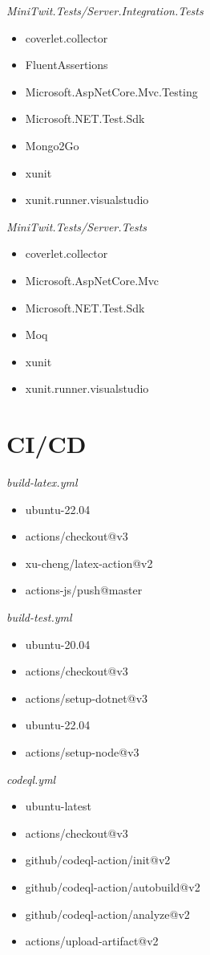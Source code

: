 \textit{MiniTwit.Tests/Server.Integration.Tests}
\begin{itemize}
   \item coverlet.collector 
   \item FluentAssertions  
   \item Microsoft.AspNetCore.Mvc.Testing    
   \item Microsoft.NET.Test.Sdk  
   \item Mongo2Go   
   \item xunit     
   \item xunit.runner.visualstudio  
\end{itemize}

\textit{MiniTwit.Tests/Server.Tests} 
\begin{itemize}
   \item coverlet.collector 
   \item Microsoft.AspNetCore.Mvc    
   \item Microsoft.NET.Test.Sdk  
   \item Moq   
   \item xunit     
   \item xunit.runner.visualstudio  
\end{itemize}


\section{CI/CD}
\textit{build-latex.yml}
\begin{itemize}
    \item ubuntu-22.04
    \item actions/checkout@v3
    \item xu-cheng/latex-action@v2
    \item actions-js/push@master
\end{itemize}

\textit{build-test.yml}
\begin{itemize}
    \item ubuntu-20.04
    \item actions/checkout@v3
    \item actions/setup-dotnet@v3
    \item ubuntu-22.04
    \item actions/setup-node@v3
\end{itemize}

\textit{codeql.yml}
\begin{itemize}
    \item ubuntu-latest
    \item actions/checkout@v3
    \item github/codeql-action/init@v2
    \item github/codeql-action/autobuild@v2
    \item github/codeql-action/analyze@v2
    \item actions/upload-artifact@v2
\end{itemize}

